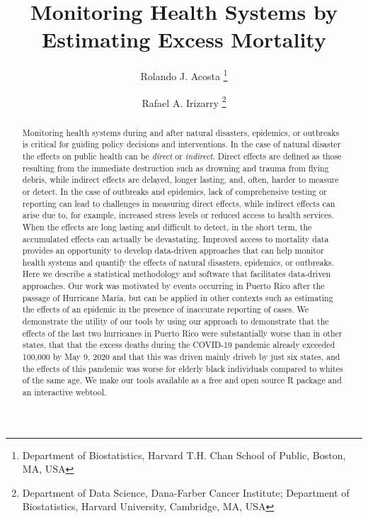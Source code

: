 \documentclass[11pt]{article}
\begin{document}
\title{Monitoring Health Systems by Estimating Excess Mortality}
 
\author{
{Rolando J. Acosta \footnote{Department of Biostatistics, Harvard T.H. Chan School of Public, Boston, MA, USA}} \and {Rafael A. Irizarry \footnote{Department of Data Science, Dana-Farber Cancer Institute; \newline Department of Biostatistics, Harvard University, Cambridge, MA, USA}}
}

\maketitle
\setcounter{page}{0}

\begin{abstract}
Monitoring health systems during and after natural disasters, epidemics, or outbreaks is critical for guiding policy decisions and interventions. In the case of natural disaster the effects on public health can be \textit{direct} or \textit{indirect}. Direct effects are defined as those resulting from the immediate destruction such as drowning and trauma from flying debris, while indirect effects are delayed, longer lasting, and, often, harder to measure or detect. In the case of outbreaks and epidemics, lack of comprehensive testing or reporting can lead to challenges in measuring direct effects, while indirect effects can arise due to, for example, increased stress levels or reduced access to health services. When the effects are long lasting and difficult to detect, in the short term, the accumulated effects can actually be devastating. Improved access to mortality data provides an opportunity to develop data-driven approaches that can help monitor health systems and quantify the effects of natural disasters, epidemics, or outbreaks.
Here we describe a statistical methodology and software that facilitates data-driven approaches. Our work was motivated by events occurring in Puerto Rico after the passage of Hurricane Mar\'ia, but can be applied in other contexts such as estimating the effects of an epidemic in the presence of inaccurate reporting of cases. We demonstrate the utility of our tools by using our approach to demonstrate that the effects of the last two hurricanes in Puerto Rico were substantially worse than in other states, that that the excess deaths during the COVID-19 pandemic already exceeded 100,000 by May 9, 2020 and that this was driven mainly driveb by just six states, and the effects of this pandemic was worse for elderly black individuals compared to whites of the same age. We make our tools available as a free and open source R package and an interactive webtool.
\end{abstract}
\end{document}
